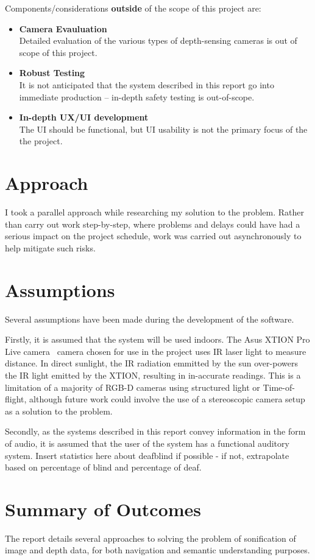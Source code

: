 Components/considerations \textbf{outside} of the scope of this project are:
\begin{itemize}
    \item \textbf{Camera Evauluation} \hfill \\
        Detailed evaluation of the various types of depth-sensing cameras is out of scope of this project. 
    \item \textbf{Robust Testing} \hfill \\
        It is not anticipated that the system described in this report go into immediate production -- in-depth safety testing is out-of-scope. 
    \item \textbf{In-depth UX/UI development} \hfill \\
        The UI should be functional, but UI usability is not the primary focus of the the project. 
\end{itemize}

\section{Approach}
I took a parallel approach while researching my solution to the problem. Rather than carry out work step-by-step, where problems and delays could have had a serious impact on the project schedule, work was carried out asynchronously to help mitigate such risks. 

\section{Assumptions}
Several assumptions have been made during the development of the software.

Firstly, it is assumed that the system will be used indoors. The Asus XTION Pro Live camera~\cite{xtion} camera chosen for use in the project uses \ac{IR} laser light to measure distance. In direct sunlight, the \ac{IR} radiation emmitted by the sun over-powers the \ac{IR} light emitted by the XTION, resulting in in-accurate readings. This is a limitation of a majority of \ac{RGB-D} cameras using structured light or Time-of-flight, although future work could involve the use of a stereoscopic camera setup as a solution to the problem.

Secondly, as the systems described in this report convey information in the form of audio, it is assumed that the user of the system has a functional auditory system. Insert statistics here about deafblind if possible - if not, extrapolate based on percentage of blind and percentage of deaf.

\section{Summary of Outcomes}
The report details several approaches to solving the problem of sonification of image and depth data, for both navigation and semantic understanding purposes. 
